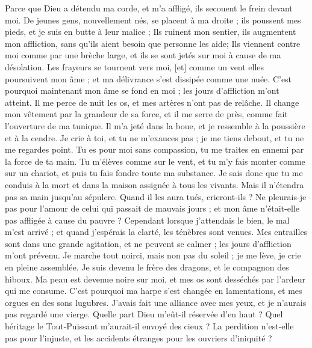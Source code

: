 \begin{multicols}{2}
{Parce que Dieu a détendu ma corde, et m'a affligé, ils secouent le frein devant moi.
De jeunes gens, nouvellement nés, se placent à ma droite ; ils poussent mes pieds, et je suis en butte à leur malice ;
Ils ruinent mon sentier, ils augmentent mon affliction, sans qu'ils aient besoin que personne les aide;
Ils viennent contre moi comme par une brèche large, et ils se sont jetés sur moi à cause de ma désolation. 
Les frayeurs se tournent vers moi, [et] comme un vent elles poursuivent mon âme ; et ma délivrance s'est dissipée comme une nuée.
C'est pourquoi maintenant mon âme se fond en moi ; les jours d'affliction m'ont atteint. 
Il me perce de nuit les os, et mes artères n'ont pas de relâche. 
Il change mon vêtement par la grandeur de sa force, et il me serre de près, comme fait l'ouverture de ma tunique.
Il m'a jeté dans la boue, et je ressemble à la poussière et à la cendre. 
Je crie à toi, et tu ne m'exauces pas ; je me tiens debout, et tu ne me regardes point. 
Tu es pour moi sans compassion, tu me traites en ennemi par la force de ta main. 
Tu m'élèves comme sur le vent, et tu m'y fais monter comme sur un chariot, et puis tu fais fondre toute ma substance. 
Je sais donc que tu me conduis à la mort et dans la maison assignée à tous les vivants.
Mais il n'étendra pas sa main jusqu'au sépulcre. Quand il les aura tués, crieront-ils ? 
Ne pleurais-je pas pour l'amour de celui qui passait de mauvais jours ; et mon âme n'était-elle pas affligée à cause du pauvre ?
Cependant lorsque j'attendais le bien, le mal m'est arrivé ; et quand j'espérais la clarté, les ténèbres sont venues. 
Mes entrailles sont dans une grande agitation, et ne peuvent se calmer ; les jours d'affliction m'ont prévenu. 
Je marche tout noirci, mais non pas du soleil ; je me lève, je crie en pleine assemblée. 
Je suis devenu le frère des dragons, et le compagnon des hiboux.
Ma peau est devenue noire sur moi, et mes os sont desséchés par l'ardeur qui me consume.
C'est pourquoi ma harpe s'est changée en lamentations, et mes orgues en des sons lugubres.
\VerseOne{}J'avais fait une alliance avec mes yeux, et je n'aurais pas regardé une vierge.
Quelle part Dieu m'eût-il réservée d'en haut ? Quel héritage le Tout-Puissant m'aurait-il envoyé des cieux ?
La perdition n'est-elle pas pour l'injuste, et les accidents étranges pour les ouvriers d'iniquité ?
}
\end{multicols}
